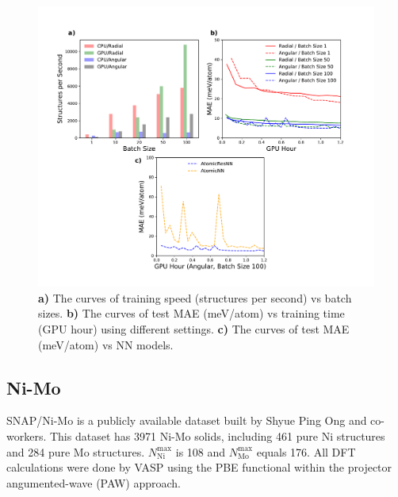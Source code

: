 \documentclass[prb,preprint]{revtex4-2}
\begin{document}
\begin{figure}[h!]
\centering
\includegraphics[scale=0.54]{figures/Fig4-qm7.pdf}
\caption{\label{fig:benchmark_qm7} 
\textbf{a)} The curves of training speed (structures per second) vs batch sizes. 
\textbf{b)} The curves of test MAE (meV/atom) vs training time (GPU hour) using 
different settings.
\textbf{c)} The curves of test MAE (meV/atom) vs NN models. 
}
\end{figure}

\subsection{Ni-Mo}

SNAP/Ni-Mo\cite{SNAP_Mo_2017, SNAP_2018} is a publicly available dataset built 
by Shyue Ping Ong and co-workers. This dataset has 3971 Ni-Mo solids, including 
461 pure Ni structures and 284 pure Mo structures. 
$N_{\mathrm{Ni}}^{\mathrm{max}}$ is 108 and $N_{\mathrm{Mo}}^{\mathrm{max}}$ 
equals 176. All DFT calculations were done by VASP\cite{VASP} using the 
PBE\cite{PBE} functional within the projector angumented-wave (PAW)\cite{PAW} 
approach.
\end{document}
